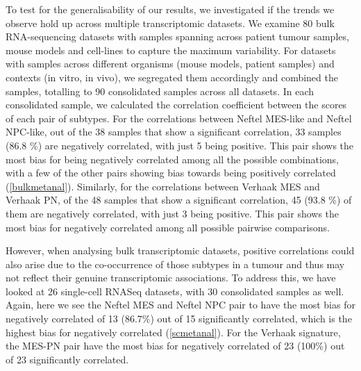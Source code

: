 \documentclass[11pt,a4paper]{article}
\begin{document}
To test for the generalisability of our results, we investigated if the trends we observe hold up across multiple transcriptomic datasets. We examine 80 bulk RNA-sequencing datasets with samples spanning across patient tumour samples, mouse models and cell-lines to capture the maximum variability. For datasets with samples across different organisms (mouse models, patient samples) and contexts (in vitro, in vivo), we segregated them accordingly and combined the samples, totalling to 90 consolidated samples across all datasets. In each consolidated sample, we calculated the correlation coefficient between the scores of each pair of subtypes. For the correlations between Neftel MES-like and Neftel NPC-like, out of the 38 samples that show a significant correlation, 33 samples (86.8 \%) are negatively correlated, with just 5 being positive. This pair shows the most bias for being negatively correlated among all the possible combinations, with a few of the other pairs showing bias towards being positively correlated (\autoref{bulkmetanal}). Similarly, for the correlations between Verhaak MES and Verhaak PN, of the 48 samples that show a significant correlation, 45 (93.8 \%) of them are negatively correlated, with just 3 being positive. This pair shows the most bias for negatively correlated among all possible pairwise comparisons.

However, when analysing bulk transcriptomic datasets, positive correlations could also arise due to the co-occurrence of those subtypes in a tumour and thus may not reflect their genuine transcriptomic associations. To address this, we have looked at 26 single-cell RNASeq datasets, with 30 consolidated samples as well. Again, here we see the Neftel MES and Neftel NPC pair to have the most bias for negatively correlated of 13 (86.7\%) out of 15 significantly correlated, which is the highest bias for negatively correlated (\autoref{scmetanal}). For the Verhaak signature, the MES-PN pair have the most bias for negatively correlated of 23 (100\%) out of 23 significantly correlated.
\end{document}
